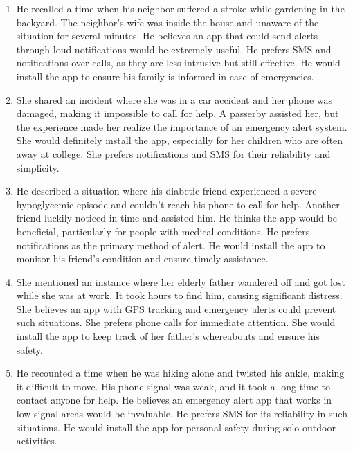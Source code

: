 \documentclass[12pt]{article}
\begin{document}
\begin{enumerate}
    \item He recalled a time when his neighbor suffered a stroke while 
    gardening in the backyard. The neighbor's wife was inside the house 
    and unaware of the situation for several minutes. He believes an app 
    that could send alerts through loud notifications would be extremely 
    useful. He prefers SMS and notifications over calls, as they are less 
    intrusive but still effective. He would install the app to ensure his 
    family is informed in case of emergencies.

    \item She shared an incident where she was in a car accident and her 
    phone was damaged, making it impossible to call for help. A passerby 
    assisted her, but the experience made her realize the importance of 
    an emergency alert system. She would definitely install the app, 
    especially for her children who are often away at college. She 
    prefers notifications and SMS for their reliability and simplicity.

    \item He described a situation where his diabetic friend experienced 
    a severe hypoglycemic episode and couldn't reach his phone to call 
    for help. Another friend luckily noticed in time and assisted him. 
    He thinks the app would be beneficial, particularly for people with 
    medical conditions. He prefers notifications as the primary method 
    of alert. He would install the app to monitor his friend's condition 
    and ensure timely assistance.

    \item She mentioned an instance where her elderly father wandered 
    off and got lost while she was at work. It took hours to find him, 
    causing significant distress. She believes an app with GPS tracking 
    and emergency alerts could prevent such situations. She prefers phone 
    calls for immediate attention. She would install the app to keep 
    track of her father's whereabouts and ensure his safety.

    \item He recounted a time when he was hiking alone and twisted
    his ankle, making it difficult to move. His phone signal was weak, 
    and it took a long time to contact anyone for help. He believes an 
    emergency alert app that works in low-signal areas would be 
    invaluable. He prefers SMS for its reliability in such situations. 
    He would install the app for personal safety during solo outdoor 
    activities.

\end{enumerate}
\end{document}
